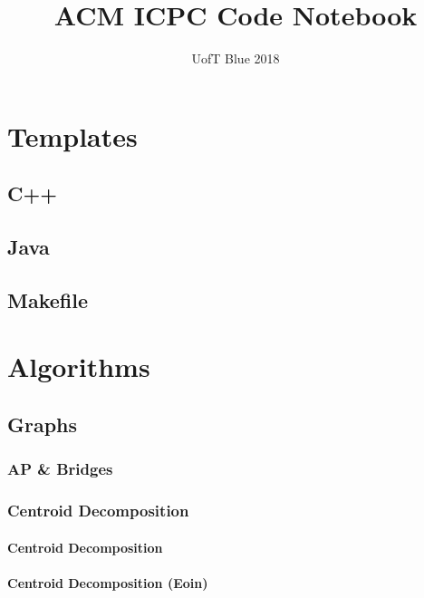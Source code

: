 \documentclass[twocolumn, landscape]{report}
\begin{document}
    \title{ACM ICPC Code Notebook}
    \author{UofT Blue 2018}
    \maketitle
    \tableofcontents
    \chapter*{Templates}
        \section{C++}
        
        \newpage
        \section{Java}
        
        \section{Makefile}
        

    \chapter*{Algorithms}
        \section{Graphs}
            \subsection{AP \& Bridges}
            
            \subsection{Centroid Decomposition}
                \subsubsection{Centroid Decomposition}
                
                \subsubsection{Centroid Decomposition (Eoin)}
                
\end{document}

